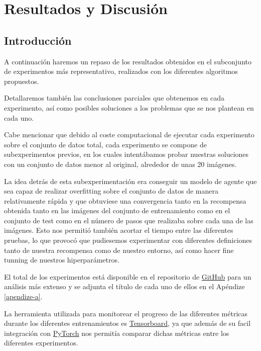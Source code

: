 
\cleardoublepage

\chapter{Resultados y Discusión}
\label{resultados-y-discusion}

\section{Introducción}
\label{resultados-introduccion}

A continuación haremos un repaso de los resultados obtenidos en el subconjunto de experimentos más representativo, realizados con los diferentes algoritmos propuestos.
\medskip

Detallaremos también las conclusiones parciales que obtenemos en cada experimento, así como posibles soluciones a los problemas que se nos plantean en cada uno.
\medskip

Cabe mencionar que debido al coste computacional de ejecutar cada experimento sobre el conjunto de datos total, cada experimento se compone de subexperimentos previos, en los cuales intentábamos probar nuestras soluciones con un conjunto de datos menor al original, alrededor de unas 20 imágenes. 
\medskip

La idea detrás de esta subexperimentación era conseguir un modelo de agente que sea capaz de realizar overfitting sobre el conjunto de datos de manera relativamente rápida y que obtuviese una convergencia tanto en la recompensa obtenida tanto en las imágenes del conjunto de entrenamiento como en el conjunto de test como en el número de pasos que realizaba sobre cada una de las imágenes. Esto nos permitió también acortar el tiempo entre las diferentes pruebas, lo que provocó que pudiesemos experimentar con diferentes definiciones tanto de nuestra recompensa como de nuestro entorno, así como hacer fine tunning de nuestros hiperparámetros.
\medskip

El total de los experimentos está disponible en el repositorio de \href{https://github.com/lucaswerner90/msc-degree-ai}{GitHub} para un análisis más extenso y se adjunta el título de cada uno de ellos en el Apéndize \ref{apendize-a}. 
\medskip

La herramienta utilizada para monitorear el progreso de las diferentes métricas durante los diferentes entrenamientos es \href{https://www.tensorflow.org/tensorboard?hl=es-419}{Tensorboard}, ya que además de su facil integración con \href{https://pytorch.org/}{PyTorch} nos permitía comparar dichas métricas entre los diferentes experimentos.


